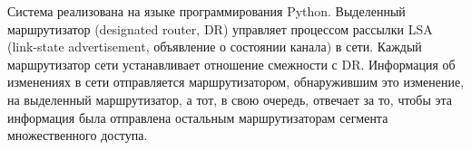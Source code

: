 Система реализована на языке программирования Python. Выделенный маршрутизатор (designated router, DR) управляет процессом рассылки LSA (link-state advertisement, объявление о состоянии канала) в сети. Каждый маршрутизатор сети устанавливает отношение смежности с DR. Информация об изменениях в сети отправляется маршрутизатором, обнаружившим это изменение, на выделенный маршрутизатор, а тот, в свою очередь, отвечает за то, чтобы эта информация была отправлена остальным маршрутизаторам сегмента множественного доступа.